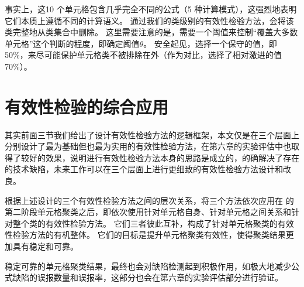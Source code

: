 事实上，这10 个单元格包含几乎完全不同的公式（5 种计算模式），这强烈地表明它们本质上遵循不同的计算语义。
通过我们的类级别的有效性检验方法，\wa 会将该类完整地从类集合中删除。
这里需要注意的是，\wa 需要一个阈值来控制“覆盖大多数单元格”这个判断的程度，即确定阈值$\theta$。
安全起见，\wa 选择一个保守的值，即 50\%，来尽可能保护单元格类不被排除在外（作为对比，\ca 选择了相对激进的值70\%）。


\section{有效性检验的综合应用}
其实前面三节我们给出了设计有效性检验方法的逻辑框架，本文仅是在三个层面上分别设计了最为基础但也最为实用的有效性检验方法，在第六章的实验评估中也取得了较好的效果，说明进行有效性检验方法本身的思路是成立的，的确解决了\cu 存在的技术缺陷，未来工作可以在三个层面上进行更细致的有效性检验方法设计和改良。

根据上述设计的三个有效性检验方法之间的层次关系，\wa 将三个方法依次应用在 \cu 的第二阶段单元格聚类之后，即依次使用针对单元格自身、针对单元格之间关系和针对整个类的有效性检验方法。
它们三者彼此互补，构成了针对单元格聚类的有效性检验方法的有机整体。
它们的目标是提升单元格聚类有效性，使得聚类结果更加具有稳定和可靠。

稳定可靠的单元格聚类结果，最终也会对缺陷检测起到积极作用，如极大地减少公式缺陷的误报数量和误报率，这部分也会在第六章的实验评估部分进行验证。